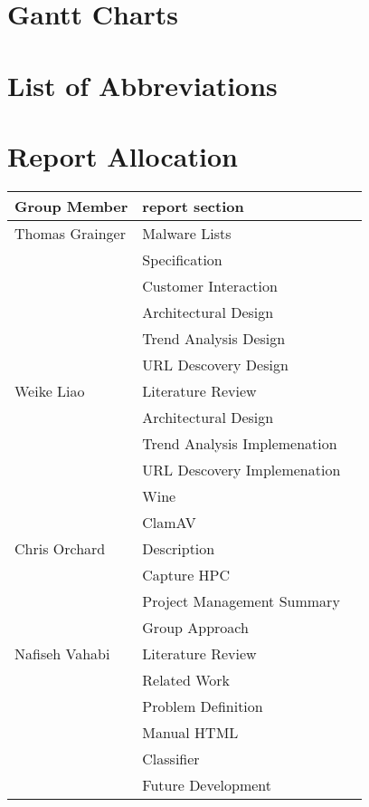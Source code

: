  \section{Gantt Charts}

\newpage
\mbox{}
\newpage
\mbox{}
\newpage

\section{List of Abbreviations}
\renewcommand{\nomname}{}
\printnomenclature



\clearpage
\section{Report Allocation}
\label{sec:words}
\begin{center}
\begin{tabularx}{\linewidth}{|XXX|}
\hline
Group Member & report section\\ \hline
Thomas Grainger & Malware Lists\\
& Specification\\
& Customer Interaction\\
& Architectural Design\\
& Trend Analysis Design\\
& URL Descovery Design\\ \hline

Weike Liao & Literature Review \\
& Architectural Design \\
& Trend Analysis Implemenation \\
& URL Descovery Implemenation \\
& Wine \\
& ClamAV \\ \hline

Chris Orchard & Description \\
& Capture HPC \\
& Project Management Summary \\
& Group Approach \\ \hline

Nafiseh Vahabi & Literature Review  \\
& Related Work \\
& Problem Definition \\
& Manual HTML \\
& Classifier \\
& Future Development \\ \hline
\hline
\end{tabularx}
\end{center}
